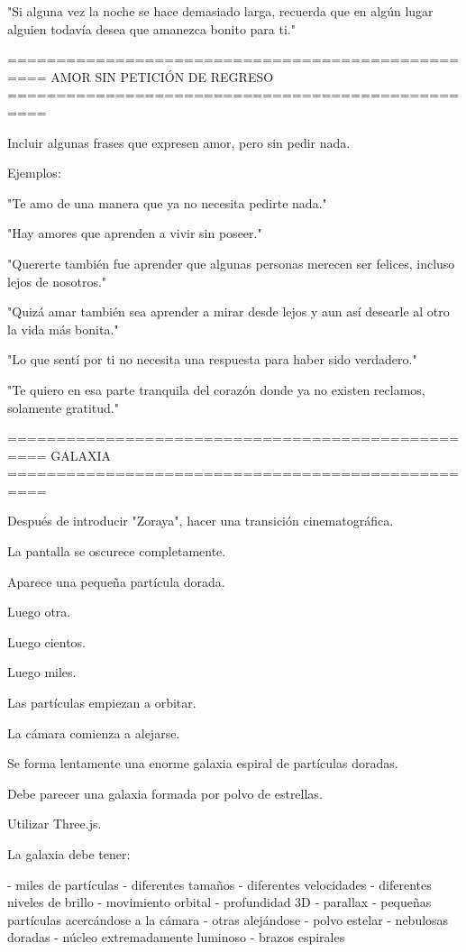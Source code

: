 "Si alguna vez la noche se hace demasiado larga, recuerda que en algún lugar alguien todavía desea que amanezca bonito para ti."

==================================================
AMOR SIN PETICIÓN DE REGRESO
==================================================

Incluir algunas frases que expresen amor, pero sin pedir nada.

Ejemplos:

"Te amo de una manera que ya no necesita pedirte nada."

"Hay amores que aprenden a vivir sin poseer."

"Quererte también fue aprender que algunas personas merecen ser felices, incluso lejos de nosotros."

"Quizá amar también sea aprender a mirar desde lejos y aun así desearle al otro la vida más bonita."

"Lo que sentí por ti no necesita una respuesta para haber sido verdadero."

"Te quiero en esa parte tranquila del corazón donde ya no existen reclamos, solamente gratitud."

==================================================
GALAXIA
==================================================

Después de introducir "Zoraya", hacer una transición cinematográfica.

La pantalla se oscurece completamente.

Aparece una pequeña partícula dorada.

Luego otra.

Luego cientos.

Luego miles.

Las partículas empiezan a orbitar.

La cámara comienza a alejarse.

Se forma lentamente una enorme galaxia espiral de partículas doradas.

Debe parecer una galaxia formada por polvo de estrellas.

Utilizar Three.js.

La galaxia debe tener:

- miles de partículas
- diferentes tamaños
- diferentes velocidades
- diferentes niveles de brillo
- movimiento orbital
- profundidad 3D
- parallax
- pequeñas partículas acercándose a la cámara
- otras alejándose
- polvo estelar
- nebulosas doradas
- núcleo extremadamente luminoso
- brazos espirales

